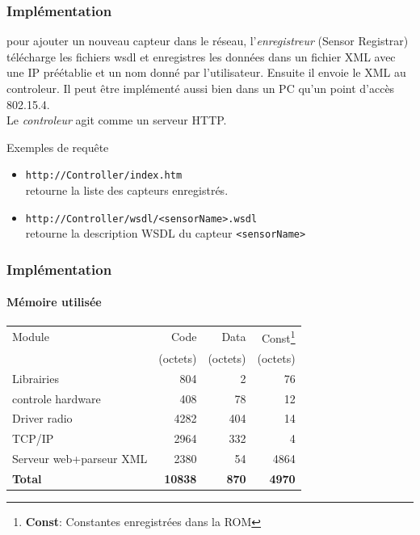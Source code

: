 \begin{frame}
 \frametitle{Implémentation}
 pour ajouter un nouveau capteur dans le réseau, l'\textit{enregistreur} (Sensor Registrar) télécharge les fichiers wsdl et enregistres les données dans un fichier XML avec une IP préétablie et un nom donné par l'utilisateur.
 Ensuite il envoie le XML au controleur.
 Il peut être implémenté aussi bien dans un PC qu'un point d'accès 802.15.4.\\
 \vspace{4mm}
 Le \textit{controleur} agit comme un serveur HTTP.
 \begin{exampleblock}{Exemples de requête}
 \begin{itemize}
  \item \texttt{http://Controller/index.htm}\\retourne la liste des capteurs enregistrés.
  \item \texttt{http://Controller/wsdl/<sensorName>.wsdl}\\retourne la description WSDL du capteur \texttt{<sensorName>}
 \end{itemize} 
 \end{exampleblock}
\end{frame}


\newcommand{\unite}{(octets)}
\begin{frame}%
 \frametitle{Implémentation}
 \framesubtitle{Mémoire utilisée}
 \begin{center}
 \begin{tabular}{|l|r|r|r|}
  \hline
  Module & Code & Data & Const\footnote{\textbf{Const}: Constantes enregistrées dans la ROM}\\
  ~ & \unite & \unite & \unite \\
  \hline
  Librairies & 804 & 2 & 76\\
  controle hardware & 408 & 78 & 12\\
  Driver radio & 4282 & 404 & 14\\
  TCP/IP & 2964 & 332 & 4\\
  Serveur web+parseur XML & 2380 & 54 & 4864\\
  \hline
  \textbf{Total} & \textbf{10838} & \textbf{870} & \textbf{4970}\\
  \hline
 \end{tabular}
 \end{center}
\end{frame}

